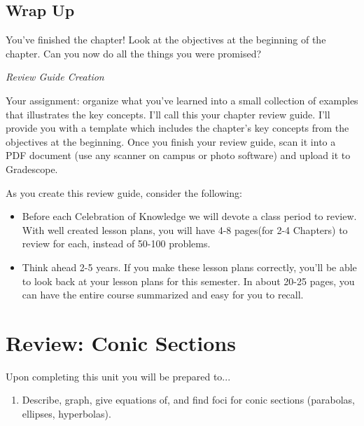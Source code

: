 \documentclass[10pt,]{book}
\theoremstyle{plain}
\theoremstyle{definition}
\theoremstyle{definition}
\theoremstyle{definition}
\theoremstyle{definition}
\theoremstyle{definition}
\numberwithin{equation}{section}
\begin{document}
\section*{Wrap Up}
You've finished the chapter! Look at the objectives at the beginning of the chapter. Can you now do all the things you were promised?%
\par
\emph{Review Guide Creation}%
\par
Your assignment: organize what you've learned into a small collection of examples that illustrates the key concepts. I'll call this your chapter review guide. I'll provide you with a template which includes the chapter's key concepts from the objectives at the beginning. Once you finish your review guide, scan it into a PDF document (use any scanner on campus or photo software) and upload it to Gradescope. %
\par
As you create this review guide, consider the following: \leavevmode%
\begin{itemize}[label=\textbullet]
\item{}Before each Celebration of Knowledge  we will devote a class period to review. With well created lesson plans, you will have 4-8 pages(for 2-4 Chapters) to review for each, instead of 50-100 problems.%
\item{}Think ahead 2-5 years. If you make these lesson plans correctly, you'll be able to look back at your lesson plans for this semester. In about 20-25 pages, you can have the entire course summarized and easy for you to recall.%
\end{itemize}
%
\typeout{************************************************}
\typeout{************************************************}
\chapter[{Review: Conic Sections}]{Review: Conic Sections}\label{chapter-3}
Upon completing this unit you will be prepared to... \leavevmode%
\begin{enumerate}
\item\hypertarget{li-35}{}Describe, graph, give equations of, and find foci for conic sections (parabolas, ellipses, hyperbolas).%
\end{enumerate}
%
\typeout{************************************************}
\typeout{************************************************}
\end{document}

